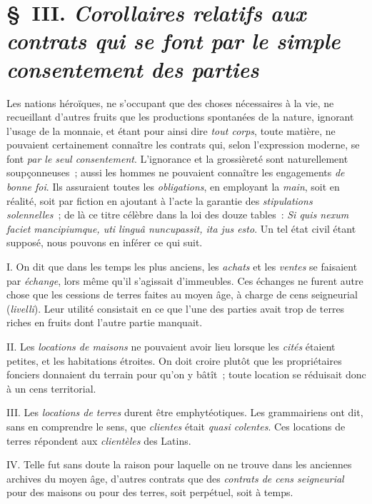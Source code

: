 \documentclass[french,twoside]{book} %
\begin{document}
\section[{§ III. Corollaires relatifs aux contrats qui se font par le simple consentement des parties}]{§ III. {\itshape Corollaires relatifs aux contrats qui se font par le simple consentement des parties}}
\noindent  Les nations héroïques, ne s’occupant que des choses nécessaires à la vie, ne recueillant d’autres fruits que les productions spontanées de la nature, ignorant l’usage de la monnaie, et étant pour ainsi dire {\itshape tout corps}, toute matière, ne pouvaient certainement connaître les contrats qui, selon l’expression moderne, se font {\itshape par le seul consentement}. L’ignorance et la grossièreté sont naturellement soupçonneuses ; aussi les hommes ne pouvaient connaître les engagements {\itshape de bonne foi}. Ils assuraient toutes les {\itshape obligations}, en employant la {\itshape main}, soit en réalité, soit par fiction en ajoutant à l’acte la garantie des {\itshape stipulations solennelles} ; de là ce titre célèbre dans la loi des douze tables : \emph{{\itshape Si quis nexum faciet mancipiumque, uti linguâ nuncupassit, ita jus esto}}. Un tel état civil étant supposé, nous pouvons en inférer ce qui suit.\par
I. On dit que dans les temps les plus anciens, les {\itshape achats} et les {\itshape ventes} se faisaient par {\itshape échange}, lors même qu’il s’agissait d’immeubles. Ces échanges ne furent autre chose que les cessions de terres faites au moyen âge, à charge de cens seigneurial ({\itshape livelli}). Leur utilité consistait en ce que l’une des parties avait trop de terres riches en fruits dont l’autre partie manquait.\par
 II. Les {\itshape locations de maisons} ne pouvaient avoir lieu lorsque les {\itshape cités} étaient petites, et les habitations étroites. On doit croire plutôt que les propriétaires fonciers donnaient du terrain pour qu’on y bâtît ; toute location se réduisait donc à un cens territorial.\par
III. Les {\itshape locations de terres} durent être emphytéotiques. Les grammairiens ont dit, sans en comprendre le sens, que {\itshape clientes} était {\itshape quasi colentes}. Ces locations de terres répondent aux {\itshape clientèles} des Latins.\par
IV. Telle fut sans doute la raison pour laquelle on ne trouve dans les anciennes archives du moyen âge, d’autres contrats que des {\itshape contrats de cens seigneurial} pour des maisons ou pour des terres, soit perpétuel, soit à temps.\par
\end{document}
